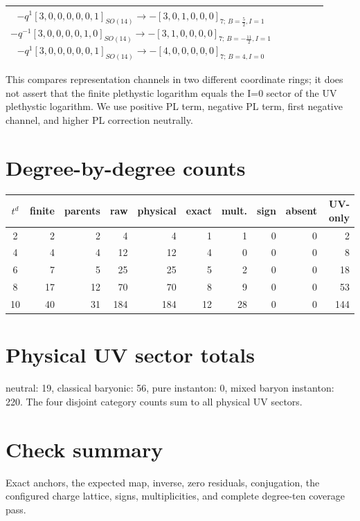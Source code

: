 \documentclass{article}
\begin{document}
\begin{landscape}
\begin{longtable}{c p{0.39\linewidth} p{0.52\linewidth}}
$-q^{1}[3,0,0,0,0,0,1]_{SO(14)}\longrightarrow -[3,0,1,0,0,0]_{7;\,B=\frac{5}{2},I=1}$\newline $-q^{-1}[3,0,0,0,0,1,0]_{SO(14)}\longrightarrow -[3,1,0,0,0,0]_{7;\,B=-\frac{11}{2},I=1}$\newline $-q^{1}[3,0,0,0,0,0,1]_{SO(14)}\longrightarrow -[4,0,0,0,0,0]_{7;\,B=4,I=0}$ \\
\bottomrule\end{longtable}\end{landscape}
This compares representation channels in two different coordinate rings; it does not assert that the finite plethystic logarithm equals the I=0 sector of the UV plethystic logarithm. We use positive PL term, negative PL term, first negative channel, and higher PL correction neutrally.
\section{Degree-by-degree counts}
\begin{center}\begin{tabular}{c|rrrrrrrrr}\toprule
$t^d$&finite&parents&raw&physical&exact&mult.&sign&absent&UV-only\\\midrule
2&2&2&4&4&1&1&0&0&2\\
4&4&4&12&12&4&0&0&0&8\\
6&7&5&25&25&5&2&0&0&18\\
8&17&12&70&70&8&9&0&0&53\\
10&40&31&184&184&12&28&0&0&144\\
\bottomrule\end{tabular}\end{center}
\section{Physical UV sector totals} neutral: 19, classical baryonic: 56, pure instanton: 0, mixed baryon instanton: 220. The four disjoint category counts sum to all physical UV sectors.
\section{Check summary} Exact anchors, the expected map, inverse, zero residuals, conjugation, the configured charge lattice, signs, multiplicities, and complete degree-ten coverage pass.
\end{document}
